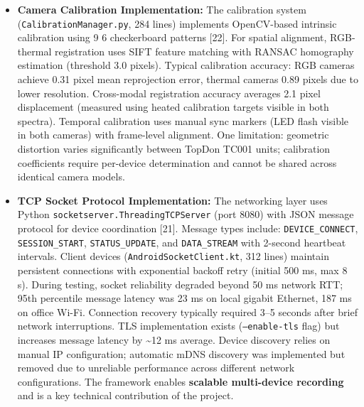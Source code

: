 \begin{itemize}
  \item \textbf{Camera Calibration Implementation:} The calibration system (\texttt{CalibrationManager.py}, 284 lines) implements OpenCV-based intrinsic calibration using 9\,\texttimes\,6 checkerboard patterns [22]. For spatial alignment, RGB-thermal registration uses SIFT feature matching with RANSAC homography estimation (threshold 3.0 pixels). Typical calibration accuracy: RGB cameras achieve 0.31 pixel mean reprojection error, thermal cameras 0.89 pixels due to lower resolution. Cross-modal registration accuracy averages 2.1 pixel displacement (measured using heated calibration targets visible in both spectra). Temporal calibration uses manual sync markers (LED flash visible in both cameras) with frame-level alignment. One limitation: geometric distortion varies significantly between TopDon TC001 units; calibration coefficients require per-device determination and cannot be shared across identical camera models.

  \item \textbf{TCP Socket Protocol Implementation:} The networking layer uses Python \texttt{socketserver.ThreadingTCPServer} (port 8080) with JSON message protocol for device coordination [21]. Message types include: \texttt{DEVICE\_CONNECT}, \texttt{SESSION\_START}, \texttt{STATUS\_UPDATE}, and \texttt{DATA\_STREAM} with 2-second heartbeat intervals. Client devices (\texttt{AndroidSocketClient.kt}, 312 lines) maintain persistent connections with exponential backoff retry (initial 500 ms, max 8 s). During testing, socket reliability degraded beyond 50 ms network RTT; 95th percentile message latency was 23 ms on local gigabit Ethernet, 187 ms on office Wi-Fi. Connection recovery typically required 3--5 seconds after brief network interruptions. TLS implementation exists (\texttt{--enable-tls} flag) but increases message latency by \textasciitilde{}12 ms average. Device discovery relies on manual IP configuration; automatic mDNS discovery was implemented but removed due to unreliable performance across different network configurations. The framework enables \textbf{scalable multi-device recording} and is a key technical contribution of the project.


\end{itemize}
